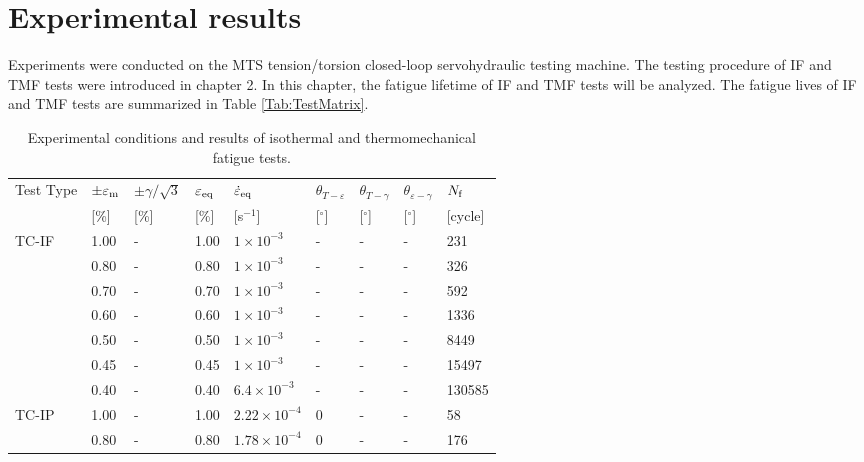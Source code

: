 \section{Experimental results}
\noindent
Experiments were conducted on the MTS tension/torsion closed-loop servohydraulic testing machine. 
The testing procedure of IF and TMF tests were introduced in chapter 2. 
In this chapter, the fatigue lifetime of IF and TMF tests will be analyzed.
The fatigue lives of IF and TMF tests are summarized in Table \ref{Tab:TestMatrix}.

\begin{table*}[htbp]
  \centering
  \caption{Experimental conditions and results of isothermal and thermomechanical fatigue tests.} \vspace{0.1cm}
    \begin{tabular}{p{2cm}p{1.2cm}p{1.2cm}p{1.2cm}p{2.5cm}p{1cm}p{1cm}p{1cm}p{1cm}}
    \hline
    Test Type & $\pm \varepsilon _{\rm m}$ & $\pm \gamma/ \sqrt 3$ & $\varepsilon _{\rm eq}$ & $\dot \varepsilon _{\rm eq}$ & $\theta_{T-\varepsilon}$ & $\theta_{T-\gamma}$ & $\theta_{\varepsilon-\gamma}$ & $N_{\rm f}$ \\
          & [\%]  & [\%]  & [\%]  & [s$^{-1}$] & [$^\circ$] & [$^\circ$] & [$^\circ$] & [cycle]\\
    \hline
    TC-IF & 1.00  & -     & 1.00  & $1\times 10^{-3}$ & -     & -     & -     & 231 \\
          & 0.80  & -     & 0.80  & $1\times 10^{-3}$ & -     & -     & -     & 326 \\
          & 0.70  & -     & 0.70  & $1\times 10^{-3}$ & -     & -     & -     & 592 \\
          & 0.60  & -     & 0.60  & $1\times 10^{-3}$ & -     & -     & -     & 1336 \\
          & 0.50  & -     & 0.50  & $1\times 10^{-3}$ & -     & -     & -     & 8449 \\
          & 0.45  & -     & 0.45  & $1\times 10^{-3}$ & -     & -     & -     & 15497 \\
          & 0.40  & -     & 0.40  & $6.4\times 10^{-3}$ & -     & -     & -     & 130585 \\
    \hline
    TC-IP & 1.00  & -     & 1.00  & $2.22\times 10^{-4}$ & 0     & -     & -     & 58 \\
          & 0.80  & -     & 0.80  & $1.78\times 10^{-4}$ & 0     & -     & -     & 176 \\

\end{tabular}
\end{table*}
